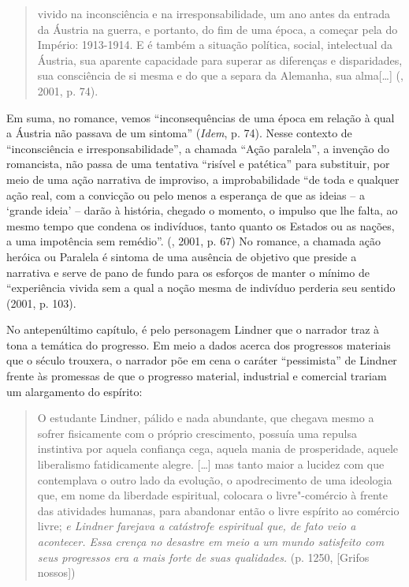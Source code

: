 {\begin{quote}
vivido na inconsciência e na irresponsabilidade, um ano antes da entrada
da Áustria na guerra, e portanto, do fim de uma época, a começar pela do
Império: 1913-1914. E é também a situação política, social, intelectual
da Áustria, sua aparente capacidade para superar as diferenças e
disparidades, sua consciência de si mesma e do que a separa da Alemanha,
sua alma[\ldots{}] (, 2001, p. 74).
\end{quote}

Em suma, no romance, vemos ``inconsequências de uma época em relação à
qual a Áustria não passava de um sintoma'' (\emph{Idem}, p. 74). Nesse
contexto de ``inconsciência e irresponsabilidade'', a chamada ``Ação
paralela'', a invenção do romancista, não passa de uma tentativa
``risível e patética'' para substituir, por meio de uma ação narrativa
de improviso, a improbabilidade ``de toda e qualquer ação real, com a
convicção ou pelo menos a esperança de que as ideias -- a `grande ideia'
-- darão à história, chegado o momento, o impulso que lhe falta, ao
mesmo tempo que condena os indivíduos, tanto quanto os Estados ou as
nações, a uma impotência sem remédio''. (, 2001, p. 67) No
romance, a chamada ação heróica ou Paralela é sintoma de uma ausência de
objetivo que preside a narrativa e serve de pano de fundo para os
esforços de manter o mínimo de ``experiência vivida sem a qual a noção
mesma de indivíduo perderia seu sentido (2001, p. 103).

No antepenúltimo capítulo, é pelo personagem Lindner que o narrador traz
à tona a temática do progresso. Em meio a dados acerca dos progressos
materiais que o século  trouxera, o narrador põe em cena o caráter
``pessimista'' de Lindner frente às promessas de que o progresso
material, industrial e comercial trariam um alargamento do espírito:

\begin{quote}
O estudante Lindner, pálido e nada abundante, que chegava mesmo a sofrer
fisicamente com o próprio crescimento, possuía uma repulsa instintiva
por aquela confiança cega, aquela mania de prosperidade, aquele
liberalismo fatidicamente alegre. [\ldots{}] mas tanto maior a
lucidez com que contemplava o outro lado da evolução, o apodrecimento de
uma ideologia que, em nome da liberdade espiritual, colocara o
livre"-comércio à frente das atividades humanas, para abandonar então o
livre espírito ao comércio livre; \emph{e Lindner farejava a catástrofe
espiritual que, de fato veio a acontecer. Essa crença no desastre em
meio a um mundo satisfeito com seus progressos era a mais forte de suas
qualidades.} (p. 1250, [Grifos nossos])
\end{quote}

}
